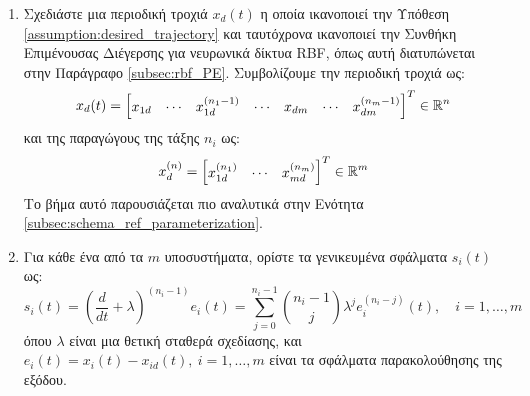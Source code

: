 \begin{enumerate}[label=\Roman*., ref=\Roman*]
	\item \label{step:trajectory_selection}
	Σχεδιάστε μια περιοδική τροχιά $x_d(t)$ η οποία ικανοποιεί την Υπόθεση \ref{assumption:desired_trajectory} και ταυτόχρονα ικανοποιεί την Συνθήκη Επιμένουσας Διέγερσης για νευρωνικά δίκτυα RBF, όπως αυτή διατυπώνεται στην Παράγραφο \ref{subsec:rbf_PE}. Συμβολίζουμε την περιοδική τροχιά ως:
	\begin{equation}
		x_d(t) = \bmqty{ x_{1d} & \cdots & x_{1d}^{(n_1-1)} & \cdots &
		x_{dm} &\cdots & x_{dm}^{(n_m-1)}}^T \in \mathbb{R}^n  \\
		\end{equation}
		και της παραγώγους της τάξης $n_i$ ως:
	\begin{equation}
		x_d^{(n)} =  \bmqty{ x_{1d}^{(n_1)} & \cdots & x_{md}^{(n_m)} }^T \in \mathbb{R}^m 
	\end{equation}
	Το βήμα αυτό παρουσιάζεται πιο αναλυτικά στην Ενότητα \ref{subsec:schema_ref_parameterization}.
	
	\item \label{step:filtered_errors}
	Για κάθε ένα από τα $m$ υποσυστήματα, ορίστε τα γενικευμένα σφάλματα $s_i(t)$ ως:
	\begin{equation*}
		s_i(t) = \left( 
		\frac{d}{dt} + \lambda
		\right)^{(n_i - 1)} e_i(t) 
		= \sum_{j=0}^{n_i-1}\binom{n_i-1}{j} \lambda^j e_i^{(n_i-j)}(t), \quad i=1,\dots,m 
	\end{equation*}
	όπου $\lambda$ είναι μια θετική σταθερά σχεδίασης, και  $ e_i(t) = x_i(t) - x_{id}(t),\: i=1,\dots,m $ είναι τα σφάλματα παρακολούθησης της εξόδου.


\end{enumerate}
